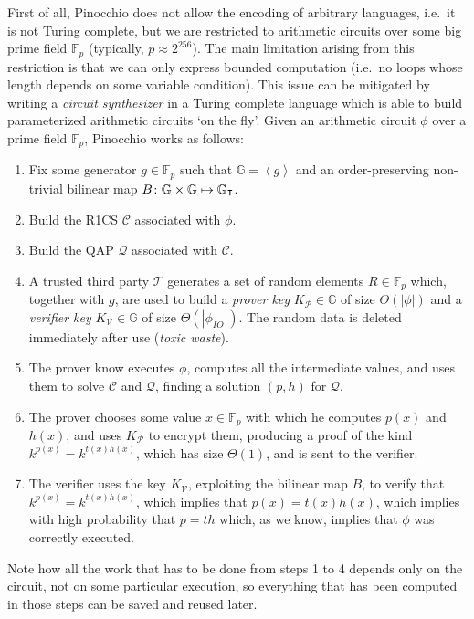 First of all, Pinocchio does not allow the encoding of arbitrary languages, i.e.\ it is not Turing
complete, but we are restricted to arithmetic circuits over some big prime field \(\mathbb{F}_p\)
(typically, \(p \approx 2^{256}\)).
The main limitation arising from this restriction is that we can only express bounded computation
(i.e.\ no loops whose length depends on some variable condition).
This issue can be mitigated by writing a \emph{circuit synthesizer} in a Turing complete language
which is able to build parameterized arithmetic circuits `on the fly'.
Given an arithmetic circuit \(\phi \) over a prime field \(\mathbb{F}_p\), Pinocchio works as
follows:
\begin{enumerate}
	\item Fix some generator \(g \in \mathbb{F}_p\) such that
	      \(\mathbb{G} = \left\langle{g}\right\rangle \) and an order-preserving non-trivial bilinear
	      map \(B\colon \mathbb{G} \times \mathbb{G} \mapsto \mathbb{G}_{\transpose}\).
	\item Build the R1CS \(\mathcal{C}\) associated with \(\phi \).
	\item Build the QAP \(\mathcal{Q}\) associated with \(\mathcal{C}\).
	\item A trusted third party \(\mathcal{T}\) generates a set of random elements
	      \(R \in \mathbb{F}_p\) which, together with \(g\), are used to build a \emph{prover key}
	      \(K_{\mathcal{P}} \in \mathbb{G}\) of size \(\Theta\left(\left|\phi\right|\right)\) and a
	      \emph{verifier key} \(K_{\mathcal{V}} \in \mathbb{G}\) of size
	      \(\Theta\left(\left|\phi_{IO}\right|\right)\).
	      The random data is deleted immediately after use (\emph{toxic waste}).
	\item The prover know executes \(\phi \), computes all the intermediate values, and uses them to
	      solve \(\mathcal{C}\) and \(\mathcal{Q}\), finding a solution \(\left(p, h\right)\) for
	      \(\mathcal{Q}\).
	\item The prover chooses some value \(x \in \mathbb{F}_p\) with which he computes
	      \(p\left(x\right)\) and \(h\left(x\right)\), and uses \(K_{\mathcal{P}}\) to encrypt them,
	      producing a proof of the kind \(k^{p(x)} =
	      k^{t\left(x\right)h\left(x\right)}\), which has size \(\Theta\left(1\right)\), and is sent
	      to the verifier.
	\item The verifier uses the key \(K_{\mathcal{V}}\), exploiting the bilinear map \(B\), to
	      verify that \(k^{p\left(x\right)} = k^{t\left(x\right)h\left(x\right)}\), which implies
	      that \(p\left(x\right) = t\left(x\right)h\left(x\right)\), which implies with
	      high probability that \(p = th\) which, as we know, implies that \(\phi \) was correctly
	      executed.
\end{enumerate}

\noindent Note how all the work that has to be done from steps 1 to 4 depends only on the
circuit, not on some particular execution, so everything that has been computed in those steps
can be saved and reused later.
